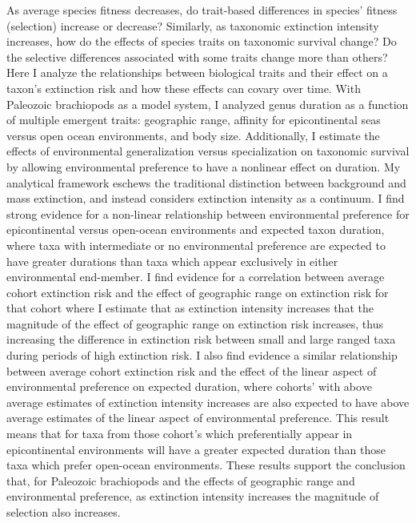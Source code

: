 \documentclass[11pt]{article}
\begin{document}
As average species fitness decreases, do trait-based differences in species' fitness (selection) increase or decrease? Similarly, as taxonomic extinction intensity increases, how do the effects of species traits on taxonomic survival change? Do the selective differences associated with some traits change more than others? Here I analyze the relationships between biological traits and their effect on a taxon's extinction risk and how these effects can covary over time. With Paleozoic brachiopods as a model system, I analyzed genus duration as a function of multiple emergent traits: geographic range, affinity for epicontinental seas versus open ocean environments, and body size. Additionally, I estimate the effects of environmental generalization versus specialization on taxonomic survival by allowing environmental preference to have a nonlinear effect on duration. My analytical framework eschews the traditional distinction between background and mass extinction, and instead considers extinction intensity as a continuum. I find strong evidence for a non-linear relationship between environmental preference for epicontinental versus open-ocean environments and expected taxon duration, where taxa with intermediate or no environmental preference are expected to have greater durations than taxa which appear exclusively in either environmental end-member. I find evidence for a correlation between average cohort extinction risk and the effect of geographic range on extinction risk for that cohort where I estimate that as extinction intensity increases that the magnitude of the effect of geographic range on extinction risk increases, thus increasing the difference in extinction risk between small and large ranged taxa during periods of high extinction risk. I also find evidence a similar relationship between average cohort extinction risk and the effect of the linear aspect of environmental preference on expected duration, where cohorts' with above average estimates of extinction intensity increases are also expected to have above average estimates of the linear aspect of environmental preference. This result means that for taxa from those cohort's which preferentially appear in epicontinental environments will have a greater expected duration than those taxa which prefer open-ocean environments. These results support the conclusion that, for Paleozoic brachiopods and the effects of geographic range and environmental preference, as extinction intensity increases the magnitude of selection also increases.

\newpage{}
\end{document}
